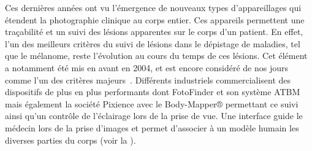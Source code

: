 Ces dernières années ont vu l'émergence de nouveaux types d'appareillages qui étendent la photographie clinique au corps entier. Ces appareils permettent une traçabilité et un suivi des lésions apparentes sur le corps d'un patient. En effet, l'un des meilleurs critères du suivi de lésions dans le dépistage de maladies, tel que le mélanome, reste l'évolution au cours du temps de ces lésions. Cet élément a notamment été mis en avant en 2004, et est encore considéré de nos jours comme l'un des critères majeurs~\cite{Abbasi2004,Glazer2017}. Différents industriels commercialisent des dispositifs de plus en plus performants dont FotoFinder et son système ATBM mais également la société Pixience avec le Body-Mapper® permettant ce suivi ainsi qu'un contrôle de l'éclairage lors de la prise de vue. Une interface guide le médecin lors de la prise d'images et permet d'associer à un modèle humain les diverses parties du corps (voir la ).\par

